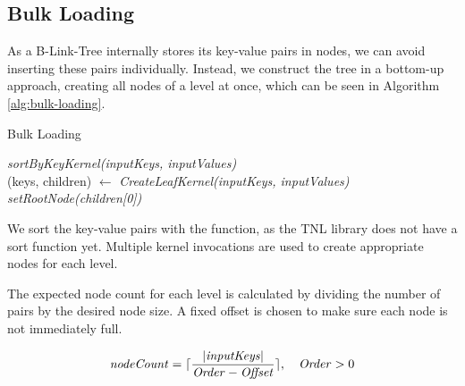 \subsection{Bulk Loading}

As a B-Link-Tree internally stores its key-value pairs in nodes, we can avoid inserting these pairs individually. Instead, we construct the tree in a bottom-up approach, creating all nodes of a level at once, which can be seen in Algorithm \ref{alg:bulk-loading}.

\begin{algorithm}[H]
  \caption{Bulk Loading}\label{alg:bulk-loading}

  \textit{sortByKeyKernel(inputKeys, inputValues)}\\
  (keys, children) $\gets$ \textit{CreateLeafKernel(inputKeys, inputValues)}\\
  \textit{setRootNode(children[0])}
\end{algorithm}

We sort the key-value pairs with the  function, as the TNL library does not have a sort function yet. Multiple kernel invocations are used to create appropriate nodes for each level.

The expected node count for each level is calculated by dividing the number of pairs by the desired node size. A fixed offset is chosen to make sure each node is not immediately full.

$$\mathit{nodeCount} = \lceil\frac{|\mathit{inputKeys}|}{\mathit{Order} - \mathit{Offset}}\rceil,\quad \begin{aligned} \mathit{Order} > 0\end{aligned}$$


